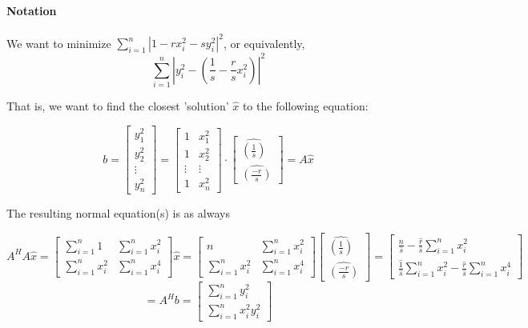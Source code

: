 \documentclass[letterpaper,12pt]{article}
\theoremstyle{definition}
\begin{document}
\paragraph{Notation}
We want to minimize $\sum_{i = 1}^n|1 -  rx_i^2 - sy_i^2|^2$, or equivalently, $$\sum_{i = 1}^n|y_i^2 - (\frac{1}{s} - \frac{r}{s} x_i^2) |^2$$ 

That is, we want to find the closest 'solution' $\hat{x}$ to the following equation:

$$b = \begin{bmatrix}
y_1^2 \\
y_2^2 \\
\vdots \\
y_n^2
\end{bmatrix}
= \begin{bmatrix}
1 & x_1^2 \\
1 & x_2^2 \\
\vdots &\vdots \\
1 & x_n^2
\end{bmatrix} 
\cdot
\begin{bmatrix}
\hat{(\frac{1}{s})} \\
\hat{(\frac{-r}{s})}
\end{bmatrix} 
= A \hat{x}$$

The resulting normal equation(s) is as always

$$ 
A^HA\hat{x} = \begin{bmatrix}
\sum_{i = 1}^n 1 & \sum_{i = 1}^n x_i^2 \\
\sum_{i = 1}^n x_i^2 & \sum_{i = 1}^n x_i^4
\end{bmatrix} 
\hat{x}
= \begin{bmatrix}
n & \sum_{i = 1}^n x_i^2 \\
\sum_{i = 1}^n x_i^2 & \sum_{i = 1}^n x_i^4
\end{bmatrix} 
\begin{bmatrix}
\hat{(\frac{1}{s})} \\
\hat{(\frac{-r}{s})}
\end{bmatrix} 
= \begin{bmatrix}
\frac{n}{\hat{s}} - \frac{\hat{r}}{\hat{s}}\sum_{i = 1}^n x_i^2 \\
\frac{\hat{1}}{\hat{s}}\sum_{i = 1}^n x_i^2 - \frac{\hat{r}}{\hat{s}} \sum_{i = 1}^n x_i^4
\end{bmatrix}  $$
$$= A^Hb 
= \begin{bmatrix}
\sum_{i = 1}^n y_i^2 \\
\sum_{i = 1}^n x_i^2 y_i^2
\end{bmatrix}  $$

\vspace{25mm}


\end{document}
